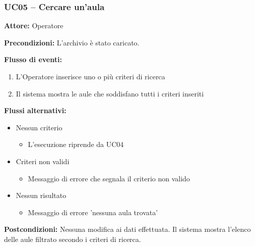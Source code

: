 \documentclass[a4paper,11pt]{article}
\begin{document}
\begin{samepage}
\subsubsection*{UC05 -- Cercare un'aula}
\begin{ucbox}

\noindent\textbf{Attore:} Operatore\par
\noindent\textbf{Precondizioni:} L'archivio è stato caricato.\par

\noindent\textbf{Flusso di eventi:}
\begin{enumerate}
\item L'Operatore inserisce uno o più criteri di ricerca \item Il sistema mostra le aule che soddisfano tutti i criteri inseriti \end{enumerate}
\noindent\textbf{Flussi alternativi:}
\begin{itemize}
\item[1a.] Nessun criterio
\begin{itemize}
\item L'esecuzione riprende da UC04
\end{itemize}
\item[1b.] Criteri non validi
\begin{itemize}
\item Messaggio di errore che segnala il criterio non valido
\end{itemize}
\item[2a.] Nessun risultato
\begin{itemize}
\item Messaggio di errore 'nessuna aula trovata'
\end{itemize}
\end{itemize}
\noindent\textbf{Postcondizioni:} Nessuna modifica ai dati effettuata. Il sistema mostra l'elenco delle aule filtrato secondo i criteri di ricerca.\par
\end{ucbox}
\end{samepage}
\end{document}
